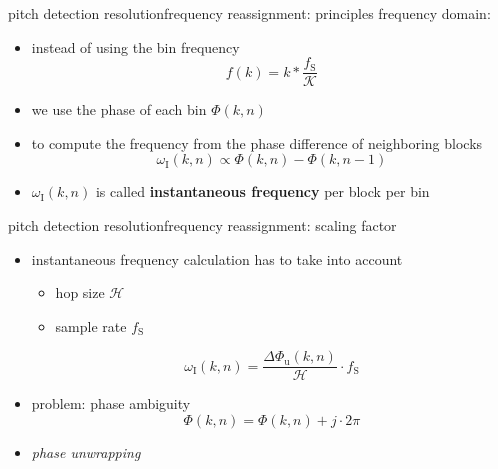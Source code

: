         \begin{frame}{pitch detection resolution}{frequency reassignment: principles}
            frequency domain:
            \begin{itemize}
                \item   instead of using the bin frequency
                    \[ f(k) = k*\frac{f_\mathrm{S}}{\mathcal{K}}\]
                \item   we use the phase of each bin $\Phi(k,n)$
                \item   to compute the frequency from the phase difference of neighboring blocks
                    \begin{equation*}\label{eq:phasediff}
                        \omega_{\mathrm{I}}(k,n)	\propto \Phi(k,n)-\Phi(k,n-1)
                    \end{equation*}
                \item<2->   $\omega_{\mathrm{I}}(k,n)$ is called \textbf{instantaneous frequency} per block per bin
            \end{itemize}
        \end{frame}
        \begin{frame}{pitch detection resolution}{frequency reassignment: scaling factor}
            \begin{itemize}
                \item instantaneous frequency calculation has to take into account
                    \begin{itemize}
                        \item   hop size $\mathcal{H}$
                        \item   sample rate $f_\mathrm{S}$
                    \end{itemize}
                
                    \begin{equation*}
                        \omega_{\mathrm{I}}(k,n) = \frac{\Delta\Phi_{\mathrm{u}}(k,n)}{\mathcal{H}}\cdot f_{\mathrm{S}} 
                    \end{equation*}
                \item<1-> problem: phase ambiguity
                    \begin{equation*}
                        \Phi(k,n) = \Phi(k,n) + j\cdot 2\pi
                    \end{equation*}
                \item<2->[$\Rightarrow$] \textit{phase unwrapping}
            \end{itemize}
        \end{frame}

